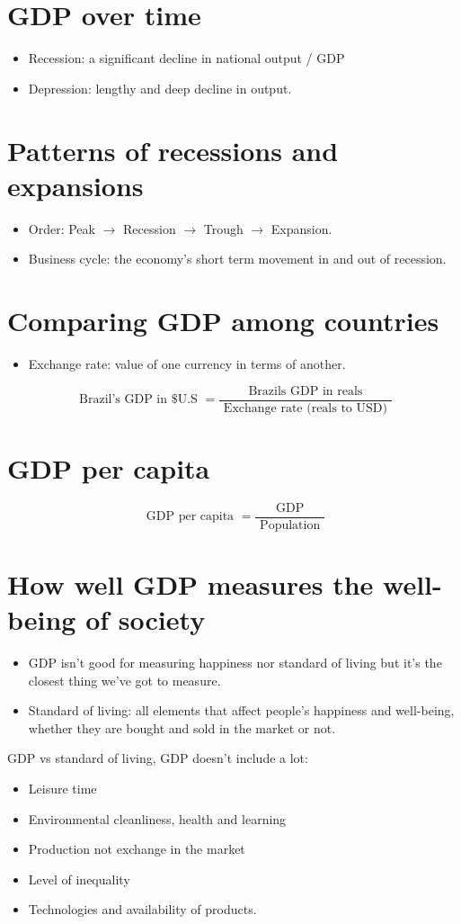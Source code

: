 \documentclass[openany]{book}
\begin{document}
\section{GDP over time}
\begin{itemize}
    \item Recession: a significant decline in national output / GDP
    \item Depression: lengthy and deep decline in output. 
\end{itemize}

\section{Patterns of recessions and expansions}
\begin{itemize}
    \item Order: Peak $\rightarrow$ Recession $\rightarrow$ Trough $\rightarrow$ Expansion. 
    \item Business cycle: the economy's short term movement in and out of recession. 
\end{itemize}

\section{Comparing GDP among countries}
\begin{itemize}
    \item Exchange rate: value of one currency in terms of another. 
\end{itemize}
\[
    \text{ Brazil's GDP in \$U.S } = \frac{\text{ Brazils GDP in reals }}{\text{ Exchange rate (reals to USD) }} 
\]

\section{GDP per capita}
\[
  \text{ GDP per capita } = \frac{\text{ GDP }}{\text{ Population }} 
\]

\section{How well GDP measures the well-being of society}
\begin{itemize}
    \item GDP isn't good for measuring happiness nor standard of living but it's the closest thing we've got to measure. 
    \item Standard of living: all elements that affect people’s happiness and well-being, whether they are bought and sold in the market or not.
\end{itemize}
GDP vs standard of living, GDP doesn't include a lot: 
\begin{itemize}
    \item Leisure time 
    \item Environmental cleanliness, health and learning 
    \item Production not exchange in the market 
    \item Level of inequality
    \item Technologies and availability of products. 
\end{itemize}
\end{document}
